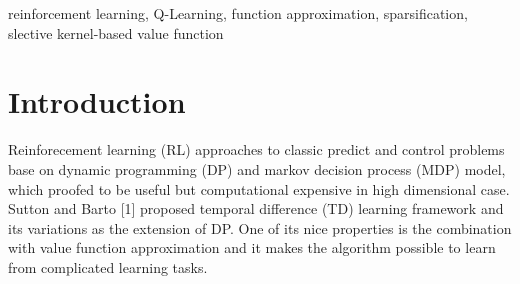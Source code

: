 \documentclass[conference]{IEEEtran}
\begin{document}
\begin{IEEEkeywords}
reinforcement learning, Q-Learning, function approximation, sparsification, slective kernel-based value function
\end{IEEEkeywords}






%
\IEEEpeerreviewmaketitle



\section{Introduction}
Reinforecement learning (RL) approaches to classic predict and control problems base on dynamic programming (DP) and markov decision process (MDP) model, which proofed to be useful but computational expensive in high dimensional case. Sutton and Barto [1] proposed temporal difference (TD) learning framework and its variations as the extension of DP. One of its nice properties is the combination with value function approximation and it makes the algorithm possible to learn from complicated learning tasks.\\
\end{document}
